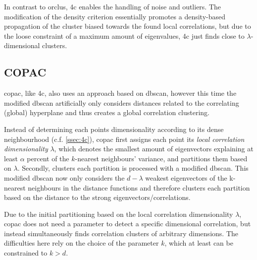 In contrast to \gls{orclus}, \gls{4c} enables the handling of noise and outliers. The modification of the density criterion essentially promotes a density-based propagation of the cluster biased towards the found local correlations, but due to the loose constraint of a maximum amount of eigenvalues, \gls{4c} just finds close to $\lambda$-dimensional clusters.

\subsection{COPAC}
\gls{copac}, like \gls{4c}, also uses an approach based on \acrshort{dbscan}, however this time the modified \acrshort{dbscan} artificially only considers distances related to the correlating (global) hyperplane and thus creates a global correlation clustering. 

Instead of determining each points dimensionality according to its dense neighbourhood (c.f. \autoref{ssec:4c}), \gls{copac} first assigns each point its \textit{local correlation dimensionality} $\lambda$, which denotes the smallest amount of eigenvectors explaining at least $\alpha$ percent of the $k$-nearest neighbours' variance, and partitions them based on $\lambda$. Secondly, clusters each partition is processed with a modified \acrshort{dbscan}. This modified \acrshort{dbscan} now only considers the $d-\lambda$ weakest eigenvectors of the k-nearest neighbours in the distance functions and therefore clusters each partition based on the distance to the strong eigenvectors/correlations.

Due to the initial partitioning based on the local correlation dimensionality $\lambda$, \gls{copac} does not need a parameter to detect a specific dimensional correlation, but instead simultaneously finds correlation clusters of arbitrary dimensions. The difficulties here rely on the choice of the parameter $k$, which at least can be constrained to $k>d$.
\\



